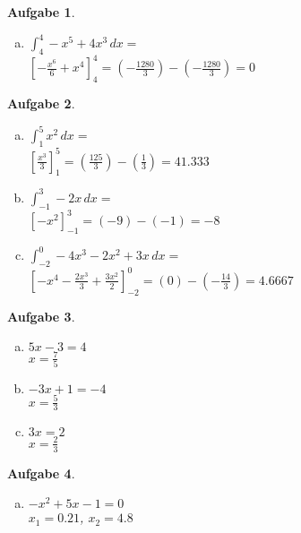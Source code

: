 \documentclass[12pt]{article}
\theoremstyle{note}
\newtheorem{aufgabe}{Aufgabe}
\begin{document}
\begin{flushleft}
\begin{aufgabe}
\begin{multicols}{3}
\begin{enumerate}[a)]
\item $\int_{4}^{4} - x^{5} + 4 x^{3}\, dx$$=$ \\$[- \frac{x^{6}}{6} + x^{4}]_{\scriptscriptstyle4}^{\scriptscriptstyle4}=(- \frac{1280}{3})-(- \frac{1280}{3})=0$
\end{enumerate} 
\end{multicols} 
\end{aufgabe}\vspace{1em}\begin{aufgabe} ~ \ 
\begin{multicols}{3} 
\begin{enumerate}[a)] 
\item $\int_{1}^{5} x^{2}\, dx$$=$ \\$[\frac{x^{3}}{3}]_{\scriptscriptstyle1}^{\scriptscriptstyle5}=(\frac{125}{3})-(\frac{1}{3})=41.333$
\item $\int_{-1}^{3} - 2 x\, dx$$=$ \\$[- x^{2}]_{\scriptscriptstyle-1}^{\scriptscriptstyle3}=(-9)-(-1)=-8$
\item $\int_{-2}^{0} - 4 x^{3} - 2 x^{2} + 3 x\, dx$$=$ \\$[- x^{4} - \frac{2 x^{3}}{3} + \frac{3 x^{2}}{2}]_{\scriptscriptstyle-2}^{\scriptscriptstyle0}=(0)-(- \frac{14}{3})=4.6667$
\end{enumerate} 
\end{multicols} 
\end{aufgabe}\vspace{1em}\begin{aufgabe} ~ \ 
\begin{multicols}{3} 
\begin{enumerate}[a)] 
\item $5 x - 3 = 4$\\
{\tiny $x=$$\frac{7}{5}$}

\item $- 3 x + 1 = -4$\\
{\tiny $x=$$\frac{5}{3}$}

\item $3 x = 2$\\
{\tiny $x=$$\frac{2}{3}$}

\end{enumerate} 
\end{multicols} 
\end{aufgabe}\vspace{1em}\begin{aufgabe} ~ \ 
\begin{multicols}{3} 
\begin{enumerate}[a)] 
\item $- x^{2} + 5 x - 1 = 0$\\
{\tiny $x_1=$$0.21$}{\tiny   ,     $x_2=$$4.8$}


\end{enumerate}
\end{multicols}
\end{aufgabe}
\end{flushleft}
\end{document}
